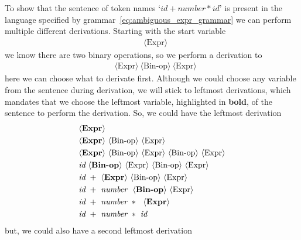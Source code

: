 \documentclass[
  oneside,
  english,
  coorientadorbanca,
  embeddedlogo,
  noabntexcite
]{ufsc-thesis-rn46-2019}
\newcommand{\bnfvar}[1]{\ \bnfvars{#1}}
\newcommand{\bnfvars}[1]{\langle\textrm{#1}\rangle}
\begin{document}
To show that the sentence of token names `$id + number * id$' is present in the language specified by grammar~\eqref{eq:ambiguous_expr_grammar} we can perform multiple different derivations. Starting with the start variable
\begin{equation*}
  \begin{aligned}
     & \bnfvars{Expr}
  \end{aligned}
\end{equation*}
we know there are two binary operations, so we perform a derivation to
\begin{equation*}
  \begin{aligned}
     & \bnfvars{Expr}\bnfvar{Bin-op}\bnfvar{Expr}
  \end{aligned}
\end{equation*}
here we can choose what to derivate first.
Although we could choose any variable from the sentence during derivation, we will stick to leftmost derivations, which mandates that we choose the leftmost variable, highlighted in \textbf{bold}, of the sentence to perform the derivation.
So, we could have the leftmost derivation
\begin{equation}\label{eq:ambiouous_derivation1}
  \begin{aligned}
     & \bnfvars{\textbf{Expr}}                                                         \\
     & \bnfvars{\textbf{Expr}}\bnfvar{Bin-op}\bnfvar{Expr}                             \\
     & \bnfvars{\textbf{Expr}}\bnfvar{Bin-op}\bnfvar{Expr}\bnfvar{Bin-op}\bnfvar{Expr} \\
     & \textit{id}\bnfvar{\textbf{Bin-op}}\bnfvar{Expr}\bnfvar{Bin-op}\bnfvar{Expr}    \\
     & \textit{id}\ + \bnfvar{\textbf{Expr}}\bnfvar{Bin-op}\bnfvar{Expr}               \\
     & \textit{id}\ + \ \textit{number} \ \bnfvar{\textbf{Bin-op}}\bnfvar{Expr}        \\
     & \textit{id}\ + \ \textit{number} \ * \ \bnfvar{\textbf{Expr}}                   \\
     & \textit{id}\ + \ \textit{number} \ * \ \textit{id}
  \end{aligned}
\end{equation}
but, we could also have a second leftmost derivation
\end{document}
